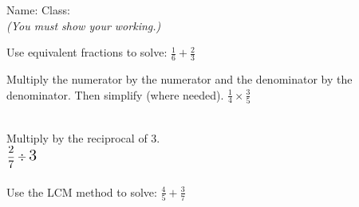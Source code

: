 \documentclass{article}
\date{}
\begin{document}
\fontsize{13}{15} \selectfont %

 \qquad Name: \hspace{5cm}  Class: \hspace{5cm}  \\
\vspace{10pt} 
\textit{(You must show your working.)  }
\vspace{5pt}

\hline
\vspace{10pt}
 \quad  Use equivalent fractions to solve: $ \displaystyle \frac{1}{6} + \displaystyle \frac{2}{3} $ \\
\vspace{100pt}

\hline
\vspace{10pt}
 \quad Multiply the numerator by the numerator and the denominator by the denominator. 
Then simplify (where needed).
$ \displaystyle \frac{1}{4} \times \displaystyle \frac{3}{5} $ \\
\vspace{100pt}


\hline
\vspace{10pt}
\\[10pt] %
 \quad Multiply by the reciprocal of 3. \\ 
\vspace{20pt}
\( \displaystyle \frac{2}{7} \div \text{\Large 3} \) \\
\\[100pt] %



\hline
\vspace{10pt}
 \quad Use the LCM method to solve: $ \displaystyle\frac{4}{5} + \displaystyle \frac{3}{7} $ \\
\vspace{100pt}
\newpage
\end{document}
